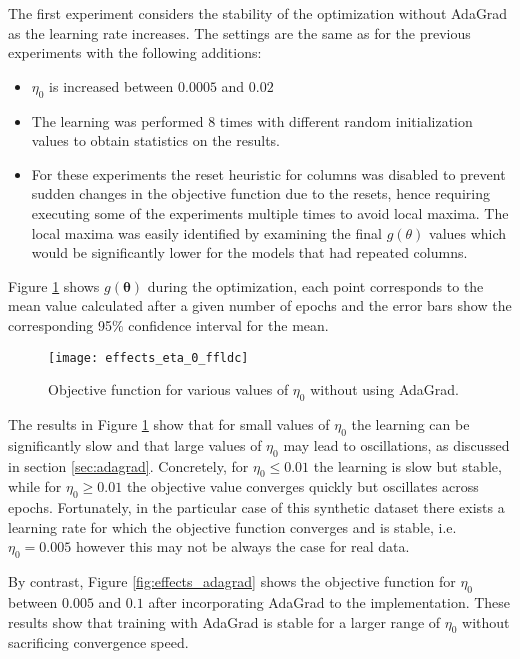 The first experiment considers the stability of the optimization without AdaGrad as the learning rate increases. The settings are the same as for the previous experiments with the following additions:

\begin{itemize}
  \item $\eta_{0}$ is increased between $0.0005$ and $0.02$
  \item The learning was performed 8 times with different random initialization values to obtain statistics on the results.
  \item For these experiments the reset heuristic for columns was disabled to prevent sudden changes in the objective function due to the resets, hence requiring executing some of the experiments multiple times to avoid local maxima. The local maxima was easily identified by examining the final $g(\theta)$ values which would be significantly lower for the models that had repeated columns.
\end{itemize}

Figure \ref{fig:effects_eta_0} shows $g(\boldsymbol{\theta})$ during the optimization, each point corresponds to the mean value calculated after a given number of epochs and the error bars show the corresponding 95\% confidence interval for the mean.

\begin{figure}
  \centering
  \texttt{[image: effects\_eta\_0\_ffldc]}
  \caption{Objective function for various values of $\eta_0$ without using AdaGrad.}
  \label{fig:effects_eta_0}
\end{figure}

The results in Figure \ref{fig:effects_eta_0} show that for small values of $\eta_0$ the learning can be significantly slow and that large values of $\eta_0$ may lead to oscillations, as discussed in section \ref{sec:adagrad}. Concretely, for $\eta_{0} \leq 0.01$ the learning is slow but stable, while for $\eta_{0} \geq 0.01$ the objective value converges quickly but oscillates across epochs. Fortunately, in the particular case of this synthetic dataset there exists a learning rate for which the objective function converges and is stable, i.e. $\eta_{0} = 0.005$ however this may not be always the case for real data.

By contrast, Figure \ref{fig:effects_adagrad} shows the objective function for $\eta_{0}$ between $0.005$ and $0.1$ after incorporating AdaGrad to the implementation. These results show that training with AdaGrad is stable for a larger range of $\eta_0$ without sacrificing convergence speed.

